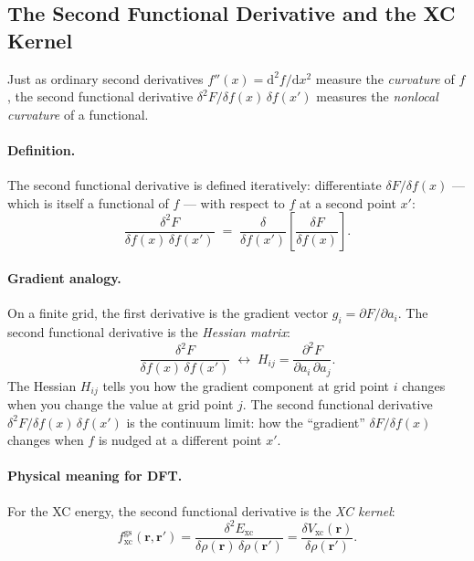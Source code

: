 \documentclass[12pt,letterpaper]{article}
\newcommand{\dd}{\mathrm{d}}
\newcommand{\Vxc}{V_{\mathrm{xc}}}
\newcommand{\fxc}{f_{\mathrm{xc}}}
\newcommand{\Exc}{E_{\mathrm{xc}}}
\theoremstyle{definition}
\begin{document}
\subsection{The Second Functional Derivative and the XC Kernel}

Just as ordinary second derivatives $f''(x) = \dd^2f/\dd x^2$ measure the
\emph{curvature} of $f$, the second functional derivative
$\delta^2 F/\delta f(x)\,\delta f(x')$ measures the \emph{nonlocal curvature}
of a functional.

\paragraph{Definition.}
The second functional derivative is defined iteratively: differentiate
$\delta F/\delta f(x)$ --- which is itself a functional of $f$ --- with
respect to $f$ at a second point $x'$:
\begin{equation}
  \frac{\delta^2 F}{\delta f(x)\,\delta f(x')}
  \;=\;
  \frac{\delta}{\delta f(x')}
  \left[\frac{\delta F}{\delta f(x)}\right].
  \label{eq:sfd_def}
\end{equation}

\paragraph{Gradient analogy.}
On a finite grid, the first derivative is the gradient vector
$g_i = \partial F/\partial a_i$.
The second functional derivative is the \emph{Hessian matrix}:
\begin{equation}
  \frac{\delta^2 F}{\delta f(x)\,\delta f(x')}
  \;\longleftrightarrow\;
  H_{ij} = \frac{\partial^2 F}{\partial a_i\,\partial a_j}.
  \label{eq:sfd_hessian}
\end{equation}
The Hessian $H_{ij}$ tells you how the gradient component at grid point $i$
changes when you change the value at grid point $j$.
The second functional derivative $\delta^2 F/\delta f(x)\,\delta f(x')$ is
the continuum limit: how the ``gradient'' $\delta F/\delta f(x)$ changes when
$f$ is nudged at a different point $x'$.

\paragraph{Physical meaning for DFT.}
For the XC energy, the second functional derivative is the \emph{XC kernel}:
\begin{equation}
  \fxc^{\mathrm{gs}}(\bm{r},\bm{r}')
  = \frac{\delta^2\Exc}{\delta\rho(\bm{r})\,\delta\rho(\bm{r}')}
  = \frac{\delta\Vxc(\bm{r})}{\delta\rho(\bm{r}')}.
  \label{eq:fxc_kernel_primer}
\end{equation}
\end{document}
